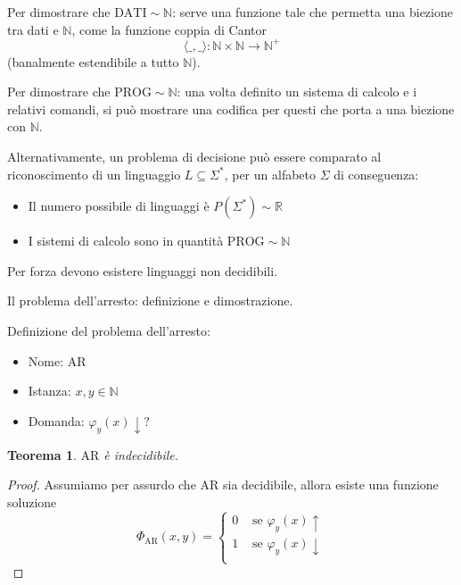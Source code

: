 \documentclass[12pt, answers]{exam}
\theoremstyle{plain}
\newtheorem{theor}{Teorema}[section]
\newcommand{\dati}{\text{DATI}}
\newcommand{\prog}{\text{PROG}}
\newcommand{\N}{\mathbb{N}}
\newcommand{\R}{\mathbb{R}}
\newcommand{\ar}{\text{AR}}
\begin{document}
\begin{questions}
\begin{solution}
            Per dimostrare che $\dati \sim \N$: serve una funzione tale che permetta una biezione tra dati e $\N$, come la funzione coppia di Cantor
            $$ \langle \_, \_ \rangle: \N \times \N \rightarrow \N^+ $$
            (banalmente estendibile a tutto $\N$).
            
            Per dimostrare che $\prog \sim \N$: una volta definito un sistema di calcolo e i relativi comandi, si può mostrare una codifica per questi che porta a una biezione con $\N$.
            
            Alternativamente, un problema di decisione può essere comparato al riconoscimento di un linguaggio $L \subseteq \Sigma^\ast$, per un alfabeto $\Sigma$ di conseguenza: 
            \begin{itemize}
                \item Il numero possibile di linguaggi è $P(\Sigma^\ast) \sim \R$
                
                \item I sistemi di calcolo sono in quantità $\prog \sim \N$
            \end{itemize}
            
            Per forza devono esistere linguaggi non decidibili.
        \end{solution}
        
        \question Il problema dell'arresto: definizione e dimostrazione.
        
        \begin{solution}
            Definizione del problema dell'arresto: 
            \begin{itemize}
                \item Nome: $\ar$
                
                \item Istanza: $x,y \in \N$
                
                \item Domanda: $\varphi_y (x) \downarrow$?
            \end{itemize}
            
            \begin{theor}
                $\ar$ è indecidibile.
            \end{theor}
            \begin{proof}
                Assumiamo per assurdo che $\ar$ sia decidibile, allora esiste una funzione soluzione
                $$
                \Phi_{\ar} (x,y) = \begin{cases}
                    0 & \text{ se } \varphi_y (x) \uparrow \\
                    1 & \text{ se } \varphi_y (x) \downarrow \\
                \end{cases}
                $$
                

\end{proof}
\end{solution}
\end{questions}
\end{document}

